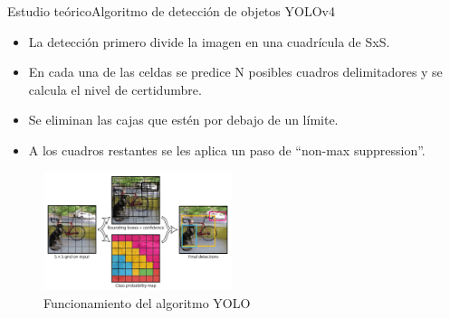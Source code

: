 
\begin{frame}{Estudio teórico}{Algoritmo de detección de objetos YOLOv4}

\begin{itemize}
    \justifying
    \item La detección primero divide la imagen en una cuadrícula de SxS.
    \item En cada una de las celdas se predice N posibles cuadros delimitadores y se calcula el nivel de certidumbre.
    \item Se eliminan las cajas que estén por debajo de un límite.
    \item A los cuadros restantes se les aplica un paso de ``non-max suppression''.
\end{itemize}

\begin{figure}[ht]
\centering
\includegraphics[width=0.49\textwidth]{Images/estudio-teorico/funcionamiento-yolo.jpg}
\caption{\label{fig:funcionamiento-yolo}Funcionamiento del algoritmo YOLO}
\end{figure}

\end{frame}


